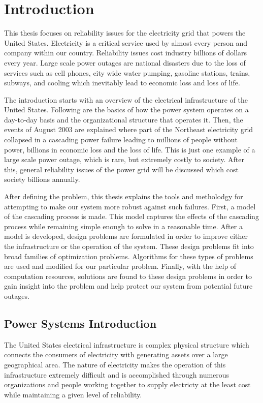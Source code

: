 \newcommand{\mypath}{../thesis}
\chapter{Introduction}
This thesis focuses on reliability issues for the electricity grid that powers the United States.  Electricity is a critical service used by almost every person and company within our country.  Reliability issues cost industry billions of dollars every year.  Large scale power outages are national disasters due to the loss of services such as cell phones, city wide water pumping, gasoline stations, trains, subways, and cooling which inevitably lead to economic loss and loss of life.  

The introduction starts with an overview of the electrical infrastructure of the United States.  Following are the basics of how the power system operates on a day-to-day basis and the organizational structure that operates it. Then, the events of August 2003 are explained where part of the Northeast electricity grid collapsed in a cascading power failure leading to millions of people without power, billions in economic loss and the loss of life.  This is just one example of a large scale power outage, which is rare, but extremely costly to society. After this, general reliability issues of the power grid will be discussed which cost society billions annually.
 
After defining the problem, this thesis explains the tools and metholodgy for attempting to make our system more robust against such failures.  First, a model of the cascading process is made.  This model captures the effects of the cascading process while remaining simple enough to solve in a reasonable time.  After a model is developed, design problems are formulated in order to improve either the infrastructure or the operation of the system.  These design problems fit into broad families of optimization problems.  Algorithms for these types of problems are used and modified for our particular problem.  Finally, with the help of computation resources, solutions are found to these design problems in order to gain insight into the problem and help protect our system from potential future outages.

\section{Power Systems Introduction}
The United States electrical infrastructure is complex physical structure which connects the consumers of electricity with generating assets over a large geographical area.  The nature of electricity makes the operation of this infrastructure extremely difficult and is accomplished through numerous organizations and people working together to supply electricty at the least cost while maintaining a given level of reliability.

